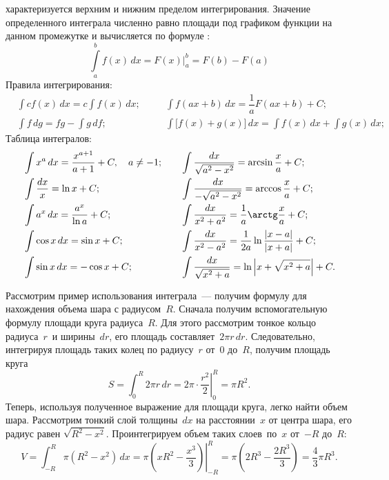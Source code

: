  характеризуется верхним и нижним пределом интегрирования. Значение определенного интеграла численно равно площади под графиком функции на данном промежутке и вычисляется по формуле :
\begin{equation}
    \int\limits^b_a f(x) \,d x = F(x) \biggr|^b_a = F(b) - F(a)
\end{equation}
Правила интегрирования:
\begin{align*}
    &\int c f(x) \,d x = c \int f(x) \,d x;\quad &&  \int f(ax + b) \,d x = \dfrac{1}{a}F(ax + b) + C;\\
    &\int f \,d g = fg - \int g \,d f; && \int \bigl[f(x) + g(x)\bigr] \,d x = \int f(x) \,d x + \int g(x) \,d x;
\end{align*}
Таблица интегралов:
\begin{align*}
    &\int  x^a \,d x = \dfrac{x^{a+1}}{a+1} + C,\quad a \neq -1; \quad
    &&\int \dfrac{dx}{\sqrt{a^2 - x^2}} = \arcsin\dfrac{x}{a} + C;\\
    &\int \frac{dx}{x} = \ln x + C;
    &&\int \dfrac{dx}{-\sqrt{a^2 - x^2}} = \arccos\dfrac{x}{a} + C;\\
    &\int a^x \,d x = \dfrac{a^x}{\ln a} + C;
    &&\int \dfrac{dx}{x^2 + a^2} = \dfrac{1}{a} \arctg \dfrac{x}{a} + C; \\
    &\int \cos x \,d x = \sin x + C;
    &&\int \dfrac{dx}{x^2 - a^2} = \dfrac{1}{2a} \ln \dfrac{|x - a|}{|x + a|} + C;\\
    &\int \sin x \,d x = -\cos x + C;
    &&\int \dfrac{dx}{\sqrt{x^2 + a}} = \ln \left| x + \sqrt{x^2 + a} \right| + C.
\end{align*}

Рассмотрим пример использования интеграла~--- получим формулу для нахождения объема шара с радиусом~$R$. Сначала получим вспомогательную формулу площади круга радиуса~$R$. Для этого рассмотрим тонкое кольцо радиуса~$r$~и ширины~$dr$, его площадь составляет~$2\pi r \,d r$. Следовательно, интегрируя площадь таких колец по радиусу~$r$ от~$0$ до~$R$, получим площадь круга
\begin{equation*}
    S = \int_0^R 2 \pi r \,d r = 2 \pi \cdot \left.\frac{r^2}{2} \right|_0^R = \pi R^2.
\end{equation*}
Теперь, используя полученное выражение для площади круга, легко найти объем шара. Рассмотрим тонкий слой толщины~$dx$ на расстоянии~$x$ от центра шара, его радиус равен $\sqrt{R^2 - x^2}$. Проинтегрируем объем таких слоев~по~$x$ от~$-R$ до~$R$:
\begin{equation*}
    V 
        = \int_{-R}^{R} \pi (R^2 - x^2) \,d x 
        = \pi \left.\left(xR^2 - \frac{x^3}{3}\right)\right|_{-R}^{R}
        = \pi \left(2R^3 - \frac{2R^3}{3} \right) 
        = \frac{4}{3} \pi R^3.
\end{equation*}


